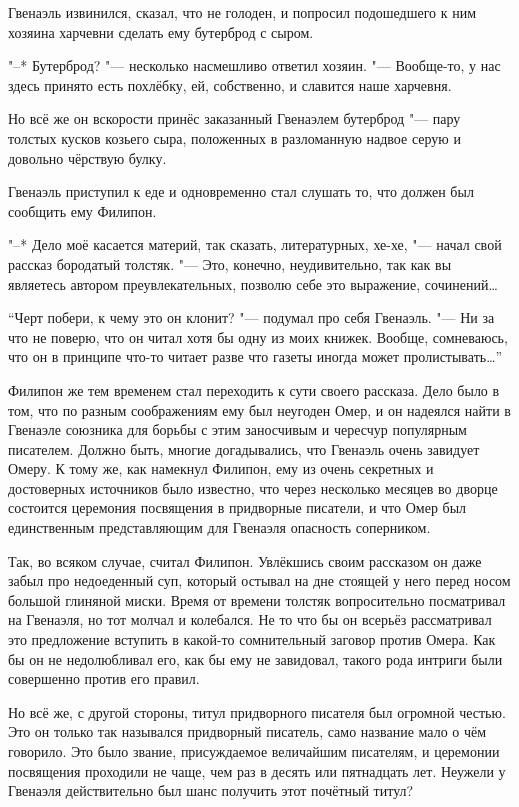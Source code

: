 Гвенаэль извинился, сказал, что не голоден, и попросил подошедшего к ним хозяина
харчевни сделать ему бутерброд с сыром.

"--* Бутерброд? "--- несколько насмешливо ответил хозяин.
"--- Вообще-то, у нас здесь принято есть похлёбку, ей, собственно, и славится
наше харчевня.

Но всё же он вскорости принёс заказанный Гвенаэлем бутерброд "--- пару толстых
кусков козьего сыра, положенных в разломанную надвое серую и довольно чёрствую
булку.

Гвенаэль приступил к еде и одновременно стал слушать то, что должен был сообщить
ему Филипон.

"--* Дело моё касается материй, так сказать, литературных, хе-хе, "--- начал
свой рассказ бородатый толстяк.
"--- Это, конечно, неудивительно, так как вы являетесь автором преувлекательных,
позволю себе это выражение, сочинений\ldots

\enquote{Черт побери, к чему это он клонит? "--- подумал про себя Гвенаэль.
"--- Ни за что не поверю, что он читал хотя бы одну из моих книжек.
Вообще, сомневаюсь, что он в принципе что-то читает разве что газеты иногда
может пролистывать\ldots}

Филипон же тем временем стал переходить к сути своего рассказа.
Дело было в том, что по разным соображениям ему был неугоден Омер, и он надеялся
найти в Гвенаэле союзника для борьбы с этим заносчивым и чересчур популярным
писателем.
Должно быть, многие догадывались, что Гвенаэль очень завидует Омеру.
К тому же, как намекнул Филипон, ему из очень секретных и достоверных источников
было известно, что через несколько месяцев во дворце состоится церемония
посвящения в придворные писатели, и что Омер был единственным представляющим для
Гвенаэля опасность соперником.

Так, во всяком случае, считал Филипон.
Увлёкшись своим рассказом он даже забыл про недоеденный суп, который остывал на
дне стоящей у него перед носом большой глиняной миски.
Время от времени толстяк вопросительно посматривал на Гвенаэля, но тот молчал и
колебался.
Не то что бы он всерьёз рассматривал это предложение вступить в какой-то
сомнительный заговор против Омера.
Как бы он не недолюбливал его, как бы ему не завидовал, такого рода интриги были
совершенно против его правил.

Но всё же, с другой стороны, титул придворного писателя был огромной честью.
Это он только так назывался придворный писатель, само название мало о чём
говорило.
Это было звание, присуждаемое величайшим писателям, и церемонии посвящения
проходили не чаще, чем раз в десять или пятнадцать лет.
Неужели у Гвенаэля действительно был шанс получить этот почётный титул?

